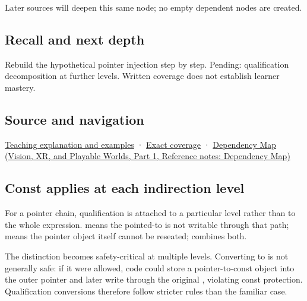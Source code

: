 Later sources will deepen this same node; no empty dependent nodes are created.

\subsection{Recall and next depth}\label{appendix-5e1a7561cd98-recall-and-next-depth}

\hypertarget{appendix-5e1a7561cd98-recall-and-next-depth}{}

Rebuild the hypothetical pointer injection step by step. Pending: qualification decomposition at further levels. Written coverage does not establish learner mastery.

\subsection{Source and navigation}\label{appendix-5e1a7561cd98-source-and-navigation}

\hypertarget{appendix-5e1a7561cd98-source-and-navigation}{}

\hyperref[01-foundations-i-ch003-read-only-is-a-path-not-an-ownership-or-synchronization-promise]{Teaching explanation and examples} · \hyperref[appendix-fd090d982a15-m008---parts-113-126]{Exact coverage} · \href{../07-Vision-XR-and-Playable-Worlds-P01/main.pdf\#nameddest=appendix-4ad47bdd269a}{Dependency Map (Vision, XR, and Playable Worlds, Part 1, Reference notes: Dependency Map)}

\subsection{Const applies at each indirection level}\label{appendix-5e1a7561cd98-const-applies-at-each-indirection-level}

\hypertarget{appendix-5e1a7561cd98-const-applies-at-each-indirection-level}{}

For a pointer chain, qualification is attached to a particular level rather than to the whole expression.  means the pointed-to  is not writable through that path;  means the pointer object itself cannot be reseated;  combines both.

The distinction becomes safety-critical at multiple levels. Converting  to  is not generally safe: if it were allowed, code could store a pointer-to-const object into the outer pointer and later write through the original , violating const protection. Qualification conversions therefore follow stricter rules than the familiar  case.

